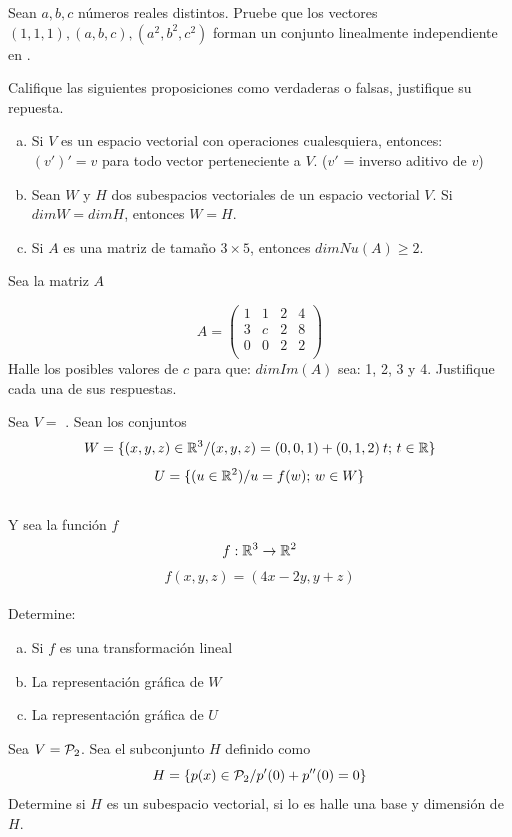 \documentclass[10pt]{article}
\begin{document}
\problem{}
Sean $a, b, c$ números reales distintos. Pruebe que los vectores $(1, 1, 1), (a, b, c), (a^2, b^2, c^2)$ forman un conjunto linealmente independiente en \rtres.

\problem{}
Califique las siguientes proposiciones como verdaderas o falsas, justifique su repuesta.\\

\begin{enumerate}[a.]
\item Si $V$ es un espacio vectorial con operaciones cualesquiera, entonces: $(v')' = v$ para todo vector perteneciente a $V$. ($v'$ = inverso aditivo de $v$)

\item Sean $W$ y $H$ dos subespacios vectoriales de un espacio vectorial $V$. Si $dim  W = dim H$, entonces $W = H$.

\item Si $A$ es una matriz de tamaño $3\times 5$, entonces $dim Nu(A)\geq 2$.
\end{enumerate}

\problem{}
Sea la matriz $A$

\[A=\begin{pmatrix}

1 & 1 & 2 & 4 \\
3 & c & 2 & 8 \\
0 & 0 & 2 & 2 \\

\end{pmatrix}\]
Halle los posibles valores de $c$ para que: $dim Im (A)$ sea: 1, 2, 3 y 4. Justifique cada una de sus respuestas.

\problem{}
Sea $V=$ \rtres. Sean los conjuntos
\[W=\lbrace(x,y,z)\in \mathbb{R}^3 /(x,y,z) = (0,0,1) + (0,1,2)\:t;\,t \in \mathbb{R}\rbrace\]
\[U=\lbrace(u \in \mathbb{R}^2)/ u = f(w);\,w \in W \rbrace\]\\
Y sea la función $f$
\[f:\mathbb{R}^3 \rightarrow \mathbb{R}^2\]
\[f(x,y,z) = (4x-2y,y+z)\]\\
Determine:\\
\begin{enumerate}[a.]
\item Si $f$ es una transformación lineal
\item La representación gráfica de $W$
\item La representación gráfica de $U$
\end{enumerate}

\problem{}
Sea $V = {\cal P}_2$. Sea el subconjunto $H$ definido como
\[H = \lbrace p(x) \in  {\cal P}_2/ p'(0) + p''(0) = 0\rbrace\]
Determine si $H$ es un subespacio vectorial, si lo es halle una base y dimensión de $H$.
\end{document}
